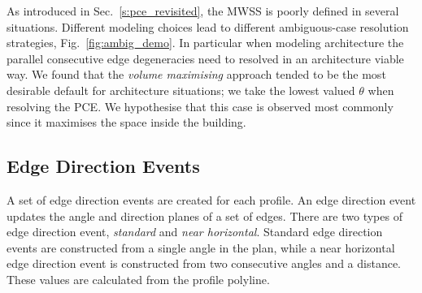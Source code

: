 As introduced in Sec.~\ref{s:pce_revisited}, the MWSS is poorly defined in several situations. Different modeling choices lead to different ambiguous-case resolution strategies, Fig.~\ref{fig:ambig_demo}. In particular when modeling architecture the parallel consecutive edge degeneracies need to resolved in an architecture viable way. We found that the \emph{volume maximising} approach tended to be the most desirable default for architecture situations; we take the lowest valued $\theta$ when resolving the PCE. We hypothesise that this case is observed most commonly since it maximises the space inside the building.






\FloatBarrier
\subsection {Edge Direction Events}
\label{section:edgeDirecitonEvents}

A set of edge direction events are created for each profile. An edge direction event updates the angle and direction planes of a set of edges. There are two types of edge direction event, \emph{standard} and \emph{near horizontal}. Standard edge direction events are constructed from a single angle in the plan, while a near horizontal edge direction event is constructed from two consecutive angles and a distance. These values are calculated from the profile polyline.


